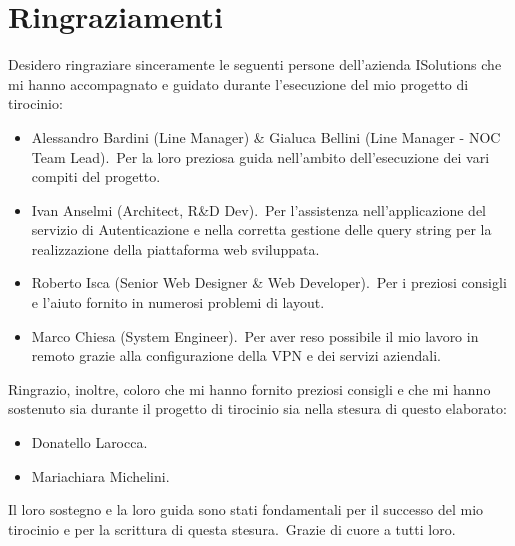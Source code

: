\chapter*{Ringraziamenti}
Desidero ringraziare sinceramente le seguenti persone dell'azienda ISolutions che mi hanno 
accompagnato e guidato durante l'esecuzione del mio progetto di tirocinio:
\begin{itemize}
    \item Alessandro Bardini (Line Manager) \& Gialuca Bellini (Line Manager \-- NOC Team Lead).\ Per la loro preziosa guida nell'ambito dell'esecuzione dei vari compiti del progetto.
    \item Ivan Anselmi (Architect, R\&D Dev).\ Per l'assistenza nell'applicazione del servizio di Autenticazione e nella corretta gestione delle query string per la realizzazione della piattaforma web sviluppata.
    \item Roberto Isca (Senior Web Designer \& Web Developer).\ Per i preziosi consigli e l'aiuto fornito in numerosi problemi di layout.
    \item Marco Chiesa (System Engineer).\ Per aver reso possibile il mio lavoro in remoto grazie alla configurazione della VPN e dei servizi aziendali.
\end{itemize}
%
Ringrazio, inoltre, coloro che mi hanno fornito preziosi consigli e che mi hanno sostenuto sia durante il progetto di tirocinio sia nella stesura di questo elaborato:
\begin{itemize}
    \item Donatello Larocca.
    \item Mariachiara Michelini.
\end{itemize}
%
Il loro sostegno e la loro guida sono stati fondamentali per il successo del mio tirocinio e per la scrittura di questa stesura.\ Grazie di cuore a tutti loro.